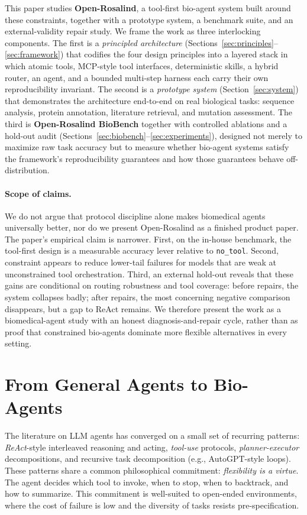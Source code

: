 \documentclass[11pt,letterpaper]{article}
\begin{document}
This paper studies \textbf{Open-Rosalind}, a tool-first bio-agent system built around these constraints, together with a prototype system, a benchmark suite, and an external-validity repair study. We frame the work as three interlocking components. The first is a \emph{principled architecture} (Sections~\ref{sec:principles}--\ref{sec:framework}) that codifies the four design principles into a layered stack in which atomic tools, MCP-style tool interfaces, deterministic skills, a hybrid router, an agent, and a bounded multi-step harness each carry their own reproducibility invariant. The second is a \emph{prototype system} (Section~\ref{sec:system}) that demonstrates the architecture end-to-end on real biological tasks: sequence analysis, protein annotation, literature retrieval, and mutation assessment. The third is \textbf{Open-Rosalind BioBench} together with controlled ablations and a hold-out audit (Sections~\ref{sec:biobench}--\ref{sec:experiments}), designed not merely to maximize raw task accuracy but to measure whether bio-agent systems satisfy the framework's reproducibility guarantees and how those guarantees behave off-distribution.

\paragraph{Scope of claims.}
We do not argue that protocol discipline alone makes biomedical agents universally better, nor do we present Open-Rosalind as a finished product paper. The paper's empirical claim is narrower. First, on the in-house benchmark, the tool-first design is a measurable accuracy lever relative to \texttt{no\_tool}. Second, constraint appears to reduce lower-tail failures for models that are weak at unconstrained tool orchestration. Third, an external hold-out reveals that these gains are conditional on routing robustness and tool coverage: before repairs, the system collapses badly; after repairs, the most concerning negative comparison disappears, but a gap to ReAct remains. We therefore present the work as a biomedical-agent study with an honest diagnosis-and-repair cycle, rather than as proof that constrained bio-agents dominate more flexible alternatives in every setting.

\section{From General Agents to Bio-Agents}
\label{sec:bioagent}

The literature on LLM agents has converged on a small set of recurring patterns: \emph{ReAct}-style interleaved reasoning and acting, \emph{tool-use} protocols, \emph{planner-executor} decompositions, and recursive task decomposition (e.g., AutoGPT-style loops). These patterns share a common philosophical commitment: \emph{flexibility is a virtue}. The agent decides which tool to invoke, when to stop, when to backtrack, and how to summarize. This commitment is well-suited to open-ended environments, where the cost of failure is low and the diversity of tasks resists pre-specification.
\end{document}
